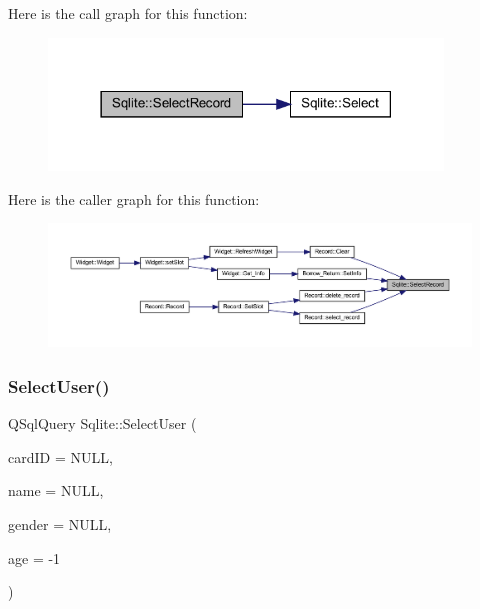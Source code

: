 Here is the call graph for this function\+:
\nopagebreak
\begin{figure}[H]
\begin{center}
\leavevmode
\includegraphics[width=297pt]{class_sqlite_a3c012aa302538385ce05d0b0371a9860_cgraph}
\end{center}
\end{figure}
Here is the caller graph for this function\+:
\nopagebreak
\begin{figure}[H]
\begin{center}
\leavevmode
\includegraphics[width=350pt]{class_sqlite_a3c012aa302538385ce05d0b0371a9860_icgraph}
\end{center}
\end{figure}
\mbox{\label{class_sqlite_a7c9c4f27369ce4566bce56614c3e11f0}} 
\subsubsection{\texorpdfstring{SelectUser()}{SelectUser()}}
{\footnotesize\ttfamily Q\+Sql\+Query Sqlite\+::\+Select\+User (\begin{DoxyParamCaption}\item[{Q\+String}]{card\+ID = {\ttfamily NULL},  }\item[{Q\+String}]{name = {\ttfamily NULL},  }\item[{Q\+String}]{gender = {\ttfamily NULL},  }\item[{int}]{age = {\ttfamily -\/1} }\end{DoxyParamCaption})}


